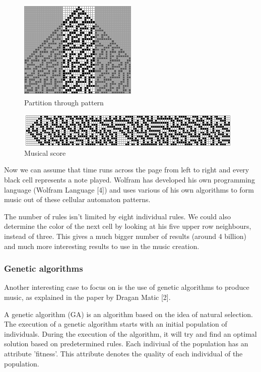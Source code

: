 \documentclass[12pt]{article}
\begin{document}
 \begin{figure}[h]
\centering
\includegraphics[]{img/wolframMusic1}
\caption{Partition through pattern}
\end{figure}

\begin{figure}[h]
\centering
\includegraphics[]{img/wolframMusic2}
\caption{Musical score}
\end{figure}

Now we can assume that time runs across the page from left to right and every black cell represents a note played. Wolfram has developed his own programming language (Wolfram Language [4]) and uses various of his own algorithms to form music out of these cellular automaton patterns.
\newline

The number of rules isn't limited by eight individual rules. We could also determine the color of the next cell by looking at his five upper row neighbours, instead of three. This gives a much bigger number of results (around 4 billion) and much more interesting results to use in the music creation. 

\subsubsection{Genetic algorithms}

Another interesting case to focus on is the use of genetic algorithms to produce music, as explained in the paper by Dragan Matic [2].
\newline

A genetic algorithm (GA) is an algorithm based on the idea of natural selection. The execution of a genetic algorithm starts with an initial population of individuals. During the execution of the algorithm, it will try and find an optimal solution based on predetermined rules. Each indiviual of the population has an attribute 'fitness'. This attribute denotes the quality of each individual of the population.
\newline
\end{document}
